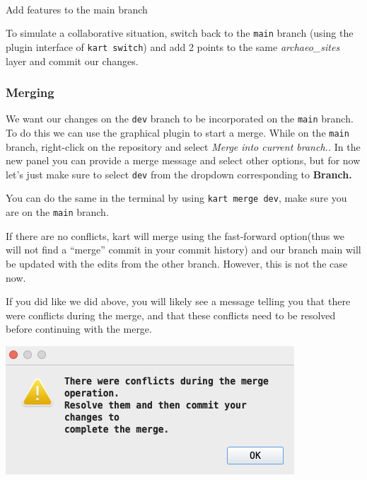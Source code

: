 \documentclass[
  letterpaper,
  DIV=11,
  numbers=noendperiod]{scrartcl}
\makeatletter
\let\oldparagraph\paragraph
\renewcommand{\paragraph}{
    \@ifstar
      \xxxParagraphStar
      \xxxParagraphNoStar
  }
\newcommand{\xxxParagraphStar}[1]{\oldparagraph*{#1}\mbox{}}
\newcommand{\xxxParagraphNoStar}[1]{\oldparagraph{#1}\mbox{}}
\makeatother
\begin{document}
\paragraph{Add features to the main
branch}\label{add-features-to-the-main-branch}

To simulate a collaborative situation, switch back to the \texttt{main}
branch (using the plugin interface of \texttt{kart\ switch}) and add 2
points to the same \emph{archaeo\_sites} layer and commit our changes.

\subsubsection{Merging}\label{sec-merging}

We want our changes on the \texttt{dev} branch to be incorporated on the
\texttt{main} branch. To do this we can use the graphical plugin to
start a merge. While on the \texttt{main} branch, right-click on the
repository and select \emph{Merge into current branch..} In the new
panel you can provide a merge message and select other options, but for
now let's just make sure to select \texttt{dev} from the dropdown
corresponding to \textbf{Branch.}

You can do the same in the terminal by using \texttt{kart\ merge\ dev},
make sure you are on the \texttt{main} branch.

If there are no conflicts, kart will merge using the fast-forward
option(thus we will not find a ``merge'' commit in your commit history)
and our branch main will be updated with the edits from the other
branch. However, this is not the case now.

If you did like we did above, you will likely see a message telling you
that there were conflicts during the merge, and that these conflicts
need to be resolved before continuing with the merge.

\begin{center}
\includegraphics{img/kart-panel-conflicts.png}
\end{center}
\end{document}
